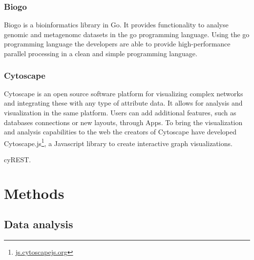 
\subsubsection*{Biogo} 
Biogo is a bioinformatics library in Go. It provides functionality to analyse
genomic and metagenomc datasets in the go programming
language.\cite{Kortschak005033} Using the go programming language the developers
are able to provide high-performance parallel processing in a clean and simple
programming language. 

\subsubsection*{Cytoscape} 
Cytoscape is an open source software platform for visualizing complex
networks and integrating these with any type of attribute
data\cite{shannon2003cytoscape}. It allows for analysis and visualization in the
same platform. Users can add additional features, such as databases connections
or new layouts, through Apps. To bring the visualization and analysis
capabilities to the web the creators of Cytoscape have developed
Cytoscape.js\footnote{\url{js.cytoscapejs.org}}, a Javascript library to create
interactive graph visualizations. 

cyREST. 


\section*{Methods} 
\subsection*{Data analysis} 

